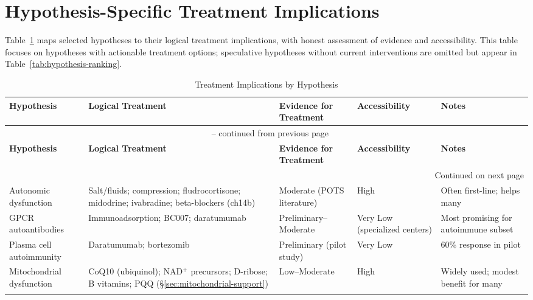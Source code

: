 \section{Hypothesis-Specific Treatment Implications}
\label{sec:treatment-implications}

Table~\ref{tab:treatment-by-hypothesis} maps selected hypotheses to their logical treatment implications, with honest assessment of evidence and accessibility. This table focuses on hypotheses with actionable treatment options; speculative hypotheses without current interventions are omitted but appear in Table~\ref{tab:hypothesis-ranking}.

\begin{longtable}{p{3.2cm}p{4.2cm}p{1.8cm}p{2.3cm}p{3.2cm}}
\caption{Treatment Implications by Hypothesis} \label{tab:treatment-by-hypothesis} \\
\toprule
\textbf{Hypothesis} & \textbf{Logical Treatment} & \textbf{Evidence for Treatment} & \textbf{Accessibility} & \textbf{Notes} \\
\midrule
\endfirsthead
\multicolumn{5}{c}{\tablename\ \thetable{} -- continued from previous page} \\
\toprule
\textbf{Hypothesis} & \textbf{Logical Treatment} & \textbf{Evidence for Treatment} & \textbf{Accessibility} & \textbf{Notes} \\
\midrule
\endhead
\midrule \multicolumn{5}{r}{Continued on next page} \\
\endfoot
\bottomrule
\endlastfoot

Autonomic dysfunction & Salt/fluids; compression; fludrocortisone; midodrine; ivabradine; beta-blockers (ch14b) & Moderate (POTS literature) & High & Often first-line; helps many \\
\addlinespace

GPCR autoantibodies & Immunoadsorption; BC007; daratumumab & Preliminary--Moderate & Very Low (specialized centers) & Most promising for autoimmune subset \\
\addlinespace

Plasma cell autoimmunity & Daratumumab; bortezomib & Preliminary (pilot study) & Very Low & 60\% response in pilot \\
\addlinespace

Mitochondrial dysfunction & CoQ10 (ubiquinol); NAD$^+$ precursors; D-ribose; B vitamins; PQQ (\S\ref{sec:mitochondrial-support}) & Low--Moderate & High & Widely used; modest benefit for many \\
\addlinespace


\end{longtable}

